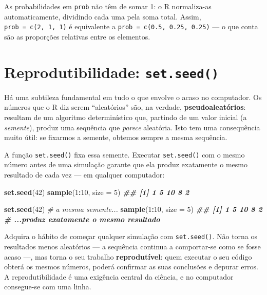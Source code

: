\documentclass[
  portuguese,
  11pt,
  openany]{book}
\newenvironment{Shaded}{\begin{snugshade}}{\end{snugshade}}
\newcommand{\AttributeTok}[1]{\textcolor[rgb]{0.13,0.29,0.53}{#1}}
\newcommand{\CommentTok}[1]{\textcolor[rgb]{0.56,0.35,0.01}{\textit{#1}}}
\newcommand{\DecValTok}[1]{\textcolor[rgb]{0.00,0.00,0.81}{#1}}
\newcommand{\DocumentationTok}[1]{\textcolor[rgb]{0.56,0.35,0.01}{\textbf{\textit{#1}}}}
\newcommand{\FunctionTok}[1]{\textcolor[rgb]{0.13,0.29,0.53}{\textbf{#1}}}
\newcommand{\NormalTok}[1]{#1}
\newcommand{\SpecialCharTok}[1]{\textcolor[rgb]{0.81,0.36,0.00}{\textbf{#1}}}
\begin{document}
As probabilidades em \texttt{prob} não têm de somar 1: o R normaliza-as automaticamente,
dividindo cada uma pela soma total. Assim, \texttt{prob\ =\ c(2,\ 1,\ 1)} é equivalente a
\texttt{prob\ =\ c(0.5,\ 0.25,\ 0.25)} --- o que conta são as proporções relativas entre os
elementos.

\section{\texorpdfstring{Reprodutibilidade: \texttt{set.seed()}}{Reprodutibilidade: set.seed()}}\label{reprodutibilidade-set.seed}

Há uma subtileza fundamental em tudo o que envolve o acaso no computador. Os números
que o R diz serem ``aleatórios'' são, na verdade, \textbf{pseudoaleatórios}: resultam de um
algoritmo determinístico que, partindo de um valor inicial (a \emph{semente}), produz uma
sequência que \emph{parece} aleatória. Isto tem uma consequência muito útil: se fixarmos a
semente, obtemos sempre a mesma sequência.

A função \texttt{set.seed()} fixa essa semente. Executar \texttt{set.seed()} com o mesmo número antes
de uma simulação garante que ela produz exatamente o mesmo resultado de cada vez --- em
qualquer computador:

\begin{Shaded}
\begin{Highlighting}[]
\FunctionTok{set.seed}\NormalTok{(}\DecValTok{42}\NormalTok{)}
\FunctionTok{sample}\NormalTok{(}\DecValTok{1}\SpecialCharTok{:}\DecValTok{10}\NormalTok{, }\AttributeTok{size =} \DecValTok{5}\NormalTok{)}
\DocumentationTok{\#\# [1] 1 5 10 8 2}

\FunctionTok{set.seed}\NormalTok{(}\DecValTok{42}\NormalTok{)     }\CommentTok{\# a mesma semente...}
\FunctionTok{sample}\NormalTok{(}\DecValTok{1}\SpecialCharTok{:}\DecValTok{10}\NormalTok{, }\AttributeTok{size =} \DecValTok{5}\NormalTok{)}
\DocumentationTok{\#\# [1] 1 5 10 8 2   \# ...produz exatamente o mesmo resultado}
\end{Highlighting}
\end{Shaded}

Adquira o hábito de começar qualquer simulação com \texttt{set.seed()}. Não torna os resultados
menos aleatórios --- a sequência continua a comportar-se como se fosse acaso ---, mas torna
o seu trabalho \textbf{reprodutível}: quem executar o seu código obterá os mesmos números,
poderá confirmar as suas conclusões e depurar erros. A reprodutibilidade é uma exigência
central da ciência, e no computador consegue-se com uma linha.
\end{document}
